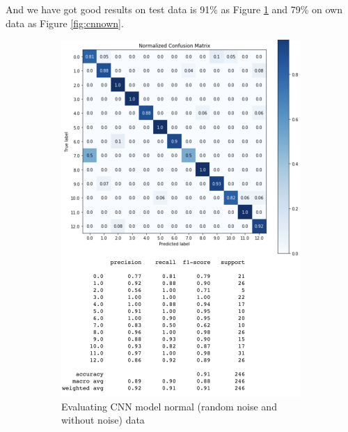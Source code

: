 \documentclass[%
  article,%
  10pt,%
  a4paper,%
  fleqn,%
  oneside,%
  sumario = tradicional,%
  chapter = TITLE,%
  section = TITLE,%
]{abntex2}
\begin{document}
And we have got good results on test data is 91\% as Figure \ref{fig:cnnall} and 79\% on own data as Figure \ref{fig:cnnown}.

\begin{figure}
\centering
\begin{minipage}[b]{.4\textwidth}
\begin{figure}[H]
  \centering
  \includegraphics[width = \columnwidth]{./Figuras/cnnall}
  \caption{Evaluating CNN model normal (random noise and without noise) data}
  \label{fig:cnnall}
\end{figure}
\end{minipage}\qquad
\begin{minipage}[b]{.4\textwidth}
\begin{figure}[H]
  \centering

\end{figure}
\end{minipage}
\end{figure}
\end{document}
